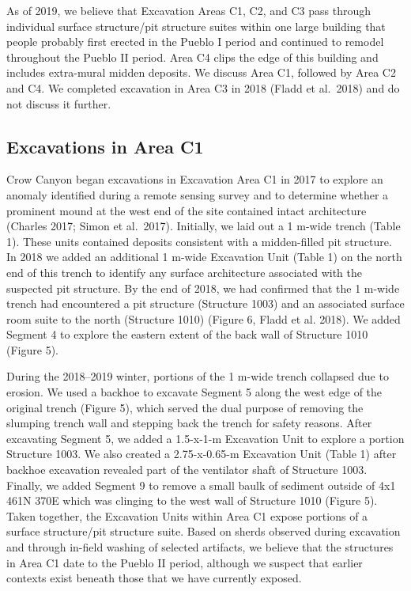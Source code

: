 \documentclass[
  12pt,
]{krantz}
\begin{document}
As of 2019, we believe that Excavation Areas C1, C2, and C3 pass through
individual surface structure/pit structure suites within one large
building that people probably first erected in the Pueblo I period and
continued to remodel throughout the Pueblo II period. Area C4 clips the
edge of this building and includes extra-mural midden deposits. We
discuss Area C1, followed by Area C2 and C4. We completed excavation in
Area C3 in 2018 (Fladd et al.~2018) and do not discuss it further.

\hypertarget{excavations-in-area-c1}{%
\subsection{Excavations in Area C1}\label{excavations-in-area-c1}}

Crow Canyon began excavations in Excavation Area C1 in 2017 to explore
an anomaly identified during a remote sensing survey and to determine
whether a prominent mound at the west end of the site contained intact
architecture (Charles 2017; Simon et al.~2017). Initially, we laid out a
1 m-wide trench (Table 1). These units contained deposits consistent
with a midden-filled pit structure. In 2018 we added an additional 1
m-wide Excavation Unit (Table 1) on the north end of this trench to
identify any surface architecture associated with the suspected pit
structure. By the end of 2018, we had confirmed that the 1 m-wide trench
had encountered a pit structure (Structure 1003) and an associated
surface room suite to the north (Structure 1010) (Figure 6, Fladd et al.
2018). We added Segment 4 to explore the eastern extent of the back wall
of Structure 1010 (Figure 5).

During the 2018--2019 winter, portions of the 1 m-wide trench collapsed
due to erosion. We used a backhoe to excavate Segment 5 along the west
edge of the original trench (Figure 5), which served the dual purpose of
removing the slumping trench wall and stepping back the trench for
safety reasons. After excavating Segment 5, we added a 1.5-x-1-m
Excavation Unit to explore a portion Structure 1003. We also created a
2.75-x-0.65-m Excavation Unit (Table 1) after backhoe excavation
revealed part of the ventilator shaft of Structure 1003. Finally, we
added Segment 9 to remove a small baulk of sediment outside of 4x1 461N
370E which was clinging to the west wall of Structure 1010 (Figure 5).
Taken together, the Excavation Units within Area C1 expose portions of a
surface structure/pit structure suite. Based on sherds observed during
excavation and through in-field washing of selected artifacts, we
believe that the structures in Area C1 date to the Pueblo II period,
although we suspect that earlier contexts exist beneath those that we
have currently exposed.
\end{document}
